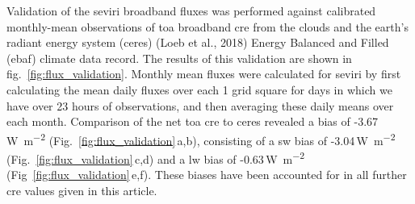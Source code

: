 Validation of the \acrshort{seviri} broadband fluxes was performed against
calibrated monthly-mean observations of \acrshort{toa} broadband \acrshort{cre} from the
clouds and the earth's radiant energy system (\acrshort{ceres}) (Loeb et al., 2018)
Energy Balanced and Filled (\acrshort{ebaf}) climate data record. The results of
this validation are shown in fig.~\ref{fig:flux_validation}. Monthly mean fluxes were calculated
for \acrshort{seviri} by first calculating the mean daily fluxes over each 1\textdegree
grid square for days in which we have over 23 hours of observations, and
then averaging these daily means over each month. Comparison of the net
\acrshort{toa} \acrshort{cre} to \acrshort{ceres} revealed a bias of -3.67\,\unit{W m^{-2}} (Fig.~\ref{fig:flux_validation}\,a,b), consisting of a \acrshort{sw} bias of -3.04\,\unit{W m^{-2}} (Fig.~\ref{fig:flux_validation}\,c,d) and a \acrshort{lw} bias of -0.63\,\unit{W m^{-2}} (Fig~\ref{fig:flux_validation}\,e,f). These
biases have been accounted for in all further \acrshort{cre} values given in this
article.


